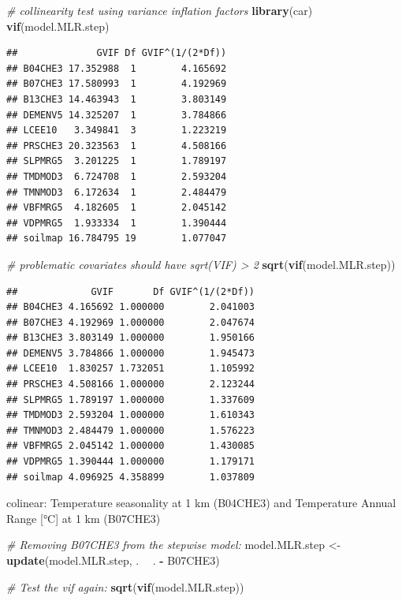 \documentclass[10pt,b5paper,]{book}
\newenvironment{Shaded}{\begin{snugshade}}{\end{snugshade}}
\newcommand{\CommentTok}[1]{\textcolor[rgb]{0.56,0.35,0.01}{\textit{#1}}}
\newcommand{\KeywordTok}[1]{\textcolor[rgb]{0.13,0.29,0.53}{\textbf{#1}}}
\newcommand{\NormalTok}[1]{#1}
\newcommand{\OperatorTok}[1]{\textcolor[rgb]{0.81,0.36,0.00}{\textbf{#1}}}
\newcommand{\StringTok}[1]{\textcolor[rgb]{0.31,0.60,0.02}{#1}}
\theoremstyle{definition}
\theoremstyle{definition}
\theoremstyle{definition}
\theoremstyle{remark}
\begin{document}
\begin{Shaded}
\begin{Highlighting}[]
\CommentTok{# collinearity test using variance inflation factors}
\KeywordTok{library}\NormalTok{(car)}
\KeywordTok{vif}\NormalTok{(model.MLR.step)}
\end{Highlighting}
\end{Shaded}

\begin{verbatim}
##              GVIF Df GVIF^(1/(2*Df))
## B04CHE3 17.352988  1        4.165692
## B07CHE3 17.580993  1        4.192969
## B13CHE3 14.463943  1        3.803149
## DEMENV5 14.325207  1        3.784866
## LCEE10   3.349841  3        1.223219
## PRSCHE3 20.323563  1        4.508166
## SLPMRG5  3.201225  1        1.789197
## TMDMOD3  6.724708  1        2.593204
## TMNMOD3  6.172634  1        2.484479
## VBFMRG5  4.182605  1        2.045142
## VDPMRG5  1.933334  1        1.390444
## soilmap 16.784795 19        1.077047
\end{verbatim}

\begin{Shaded}
\begin{Highlighting}[]
\CommentTok{# problematic covariates should have sqrt(VIF) > 2}
\KeywordTok{sqrt}\NormalTok{(}\KeywordTok{vif}\NormalTok{(model.MLR.step))}
\end{Highlighting}
\end{Shaded}

\begin{verbatim}
##             GVIF       Df GVIF^(1/(2*Df))
## B04CHE3 4.165692 1.000000        2.041003
## B07CHE3 4.192969 1.000000        2.047674
## B13CHE3 3.803149 1.000000        1.950166
## DEMENV5 3.784866 1.000000        1.945473
## LCEE10  1.830257 1.732051        1.105992
## PRSCHE3 4.508166 1.000000        2.123244
## SLPMRG5 1.789197 1.000000        1.337609
## TMDMOD3 2.593204 1.000000        1.610343
## TMNMOD3 2.484479 1.000000        1.576223
## VBFMRG5 2.045142 1.000000        1.430085
## VDPMRG5 1.390444 1.000000        1.179171
## soilmap 4.096925 4.358899        1.037809
\end{verbatim}

colinear: Temperature seasonality at 1 km (B04CHE3) and Temperature
Annual Range {[}°C{]} at 1 km (B07CHE3)

\begin{Shaded}
\begin{Highlighting}[]
\CommentTok{# Removing B07CHE3 from the stepwise model:}
\NormalTok{model.MLR.step <-}\StringTok{ }\KeywordTok{update}\NormalTok{(model.MLR.step, . }\OperatorTok{~}\StringTok{ }\NormalTok{. }\OperatorTok{-}\StringTok{ }\NormalTok{B07CHE3)}

\CommentTok{# Test the vif again:}
\KeywordTok{sqrt}\NormalTok{(}\KeywordTok{vif}\NormalTok{(model.MLR.step))}
\end{Highlighting}
\end{Shaded}
\end{document}
